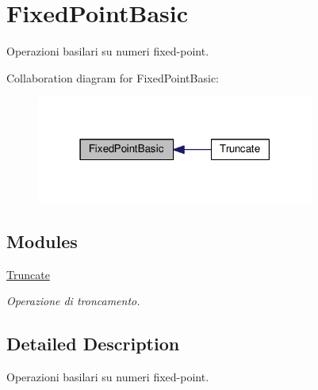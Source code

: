 \hypertarget{group___fixed_point_basic}{\section{Fixed\+Point\+Basic}
\label{group___fixed_point_basic}
}


Operazioni basilari su numeri fixed-\/point.  


Collaboration diagram for Fixed\+Point\+Basic\+:
\nopagebreak
\begin{figure}[H]
\begin{center}
\leavevmode
\includegraphics[width=259pt]{group___fixed_point_basic}
\end{center}
\end{figure}
\subsection*{Modules}
\begin{DoxyCompactItemize}
\item 
\hyperlink{group___truncate}{Truncate}
\begin{DoxyCompactList}\small\item\em Operazione di troncamento. \end{DoxyCompactList}\end{DoxyCompactItemize}


\subsection{Detailed Description}
Operazioni basilari su numeri fixed-\/point. 

